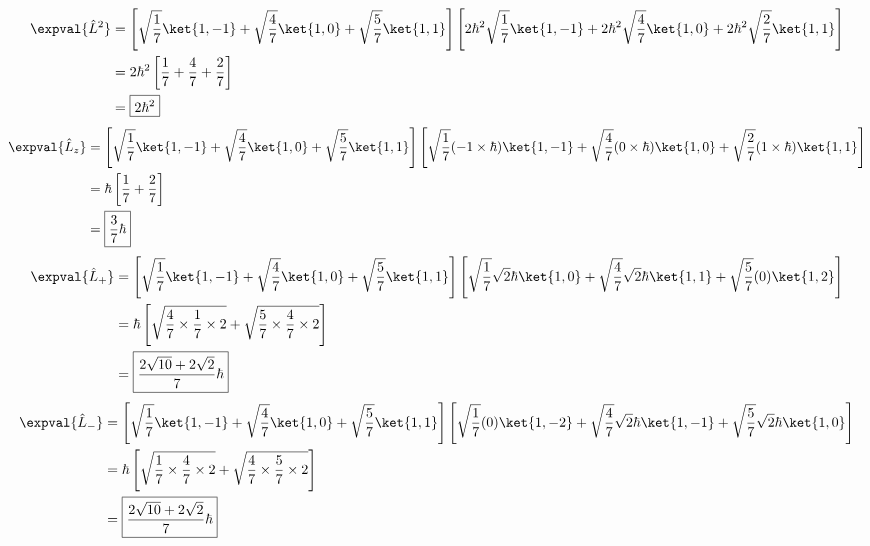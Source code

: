 \documentclass{article}
\begin{document}
\begin{enumerate}
		\begin{equation}
			\begin{aligned}[b]
				\expval{\hat{L}^2} &= \left[ \sqrt{\frac{1}{7}} \ket{1,-1} + \sqrt{\frac{4}{7}} \ket{1,0} + \sqrt{\frac{5}{7}} \ket{1,1} \right] \left[ 2\hbar^2 \sqrt{\frac{1}{7}} \ket{1,-1} + 2\hbar^2 \sqrt{\frac{4}{7}} \ket{1,0} + 2\hbar^2 \sqrt{\frac{2}{7}} \ket{1,1} \right] \\
								   &= 2\hbar^2 \left[ \frac{1}{7} + \frac{4}{7} + \frac{2}{7} \right] \\
								   &= \boxed{2\hbar^2} 
			\end{aligned}
		\end{equation}
		\begin{equation}
			\begin{aligned}[b]
				\expval{\hat{L}_z} &= \left[ \sqrt{\frac{1}{7}} \ket{1,-1} + \sqrt{\frac{4}{7}} \ket{1,0} + \sqrt{\frac{5}{7}} \ket{1,1} \right] \left[ \sqrt{\frac{1}{7}} (-1 \times \hbar) \ket{1,-1} + \sqrt{\frac{4}{7}} (0 \times \hbar) \ket{1,0} + \sqrt{\frac{2}{7}} (1 \times \hbar) \ket{1,1} \right] \\
								   &= \hbar \left[ \frac{1}{7} + \frac{2}{7} \right] \\
								   &= \boxed{\frac{3}{7} \hbar}
			\end{aligned}
		\end{equation}
		\begin{equation}
			\begin{aligned}[b]
				\expval{\hat{L}_+} &= \left[ \sqrt{\frac{1}{7}} \ket{1,-1} + \sqrt{\frac{4}{7}} \ket{1,0} + \sqrt{\frac{5}{7}} \ket{1,1} \right] \left[ \sqrt{\frac{1}{7}} \sqrt{2}\hbar \ket{1,0} + \sqrt{\frac{4}{7}} \sqrt{2}\hbar \ket{1,1} + \sqrt{\frac{5}{7}} (0) \ket{1,2} \right] \\
								   &= \hbar \left[ \sqrt{\frac{4}{7} \times \frac{1}{7} \times 2} + \sqrt{\frac{5}{7} \times \frac{4}{7} \times 2} \right] \\
								   &= \boxed{\frac{2\sqrt{10} + 2\sqrt{2}}{7} \hbar}
			\end{aligned}
		\end{equation}
		\begin{equation}
			\begin{aligned}[b]
				\expval{\hat{L}_-} &= \left[ \sqrt{\frac{1}{7}} \ket{1,-1} + \sqrt{\frac{4}{7}} \ket{1,0} + \sqrt{\frac{5}{7}} \ket{1,1} \right] \left[ \sqrt{\frac{1}{7}} (0) \ket{1,-2} + \sqrt{\frac{4}{7}} \sqrt{2}\hbar \ket{1,-1} + \sqrt{\frac{5}{7}} \sqrt{2}\hbar \ket{1,0} \right] \\
								   &= \hbar \left[ \sqrt{\frac{1}{7} \times \frac{4}{7} \times 2} + \sqrt{\frac{4}{7} \times \frac{5}{7} \times 2} \right] \\
								   &= \boxed{\frac{2\sqrt{10} + 2\sqrt{2}}{7} \hbar}
			\end{aligned}
		\end{equation}
		

\end{enumerate}
\end{document}

